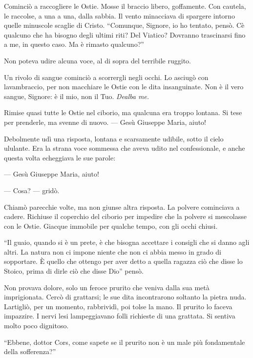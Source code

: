 Cominciò a raccogliere le Ostie. Mosse il braccio libero, goffamente.
Con cautela, le raccolse, a una a una, dalla sabbia. Il vento minacciava
di spargere intorno quelle minuscole scaglie di Cristo. ``Comunque,
Signore, io ho tentato, pensò. C\textquotesingle è qualcuno che ha
bisogno degli ultimi riti? Del Viatico? Dovranno trascinarsi fino a me,
in questo caso. Ma è rimasto qualcuno?''

Non poteva udire alcuna voce, al di sopra del terribile ruggito.

Un rivolo di sangue cominciò a scorrergli negli occhi. Lo asciugò con
l\textquotesingle avambraccio, per non macchiare le Ostie con le dita
insanguinate. Non è il vero sangue, Signore: è il mio, non il Tuo.
\emph{Dealba me.}

Rimise quasi tutte le Ostie nel ciborio, ma qualcuna era troppo lontana.
Si tese per prenderle, ma svenne di nuovo. --- Gesù Giuseppe Maria,
aiuto!

Debolmente udì una risposta, lontana e scarsamente udibile, sotto il
cielo ululante. Era la strana voce sommessa che aveva udito nel
confessionale, e anche questa volta echeggiava le sue parole:

--- Gesù Giuseppe Maria, aiuto!

--- Cosa? --- gridò.

Chiamò parecchie volte, ma non giunse altra risposta. La polvere
cominciava a cadere. Richiuse il coperchio del ciborio per impedire che
la polvere si mescolasse con le Ostie. Giacque immobile per qualche
tempo, con gli occhi chiusi.

``Il guaio, quando si è un prete, è che bisogna accettare i consigli che
si danno agli altri. La natura non ci impone niente che non ci abbia
messo in grado di sopportare. È quello che ottengo per aver detto a
quella ragazza ciò che disse lo Stoico, prima di dirle ciò che disse
Dio'' pensò.

Non provava dolore, solo un feroce prurito che veniva dalla sua metà
imprigionata. Cercò di grattarsi; le sue dita incontrarono soltanto la
pietra nuda. L\textquotesingle artigliò, per un momento, rabbrividì, poi
tolse la mano. Il prurito lo faceva impazzire. I nervi lesi
lampeggiavano folli richieste di una grattata. Si sentiva molto poco
dignitoso.

``Ebbene, dottor Cors, come sapete se il prurito non è un male più
fondamentale della sofferenza?''

